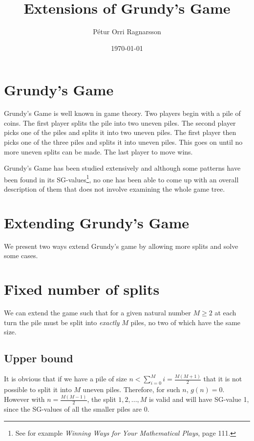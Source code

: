\documentclass[english,a4paper,twoside]{amsart}
\theoremstyle{definition}
\begin{document}
\title[exesefsfe]{Extensions of Grundy's Game}

\author{Pétur Orri Ragnarsson}

\date{\today}

\maketitle

\thispagestyle{empty}

\section{Grundy's Game}
Grundy's Game is well known in game theory. Two players begin with a pile of coins.
The first player splits the pile into two uneven piles. The second player picks one of the
piles and splits it into two uneven piles. The first player then picks one of the three piles
and splits it into uneven piles. This goes on until no more uneven splits can be made. The
last player to move wins.

Grundy's Game has been studied extensively and although some patterns have been found
in its SG-values\footnote{See for example \emph{Winning Ways for Your Mathematical Plays}, page 111.},
no one has been able to come up with an overall description of them
that does not involve examining the whole game tree.

\section{Extending Grundy's Game}
We present two ways extend Grundy's game by allowing more splits and solve some cases.

\section{Fixed number of splits}
We can extend the game such that for a given natural number $M \geq 2$ at each turn the
pile must be split into \emph{exactly} $M$ piles, no two of which have the same size.

\subsection{Upper bound}
It is obvious that if we have a pile of size $n < \sum_{i=0}^{M} i = \frac{M(M+1)}{2}$ that it is
not possible to split it into $M$ uneven piles. Therefore, for such $n$, $g(n) = 0$.
However with $n = \frac{M(M-1)}{2}$, the split $1, 2, ..., M$ is valid and will have SG-value 1,
since the SG-values of all the smaller piles are 0.
\end{document}
